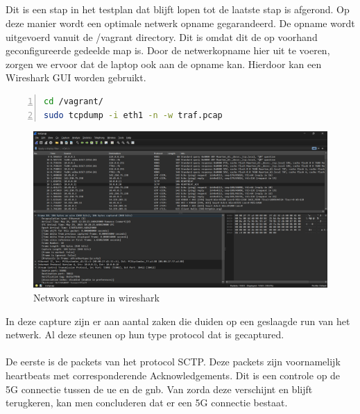 \subsection{}%
\label{sec:Test-capture}%

Dit is een stap in het testplan dat blijft lopen tot de laatste stap is afgerond. Op deze manier wordt een optimale netwerk opname gegarandeerd. De opname wordt uitgevoerd vanuit de /vagrant directory. Dit is omdat dit de op voorhand geconfigureerde gedeelde map is. Door de netwerkopname hier uit te voeren, zorgen we ervoor dat de laptop ook aan de opname kan. Hierdoor kan een Wireshark GUI worden gebruikt.

\begin{lstlisting}[basicstyle=\small, frame=single, breaklines=true, postbreak=\mbox{\textcolor{red}{$\hookrightarrow$}\space}, escapeinside ={\%,}, escapechar={!}, numbers=left, language=sh, caption=Test - Tcpdump]
cd /vagrant/
sudo tcpdump -i eth1 -n -w traf.pcap
\end{lstlisting}

\begin{figure}[H]
    \includegraphics[width=\linewidth]{../graphics/POC-wireshark.png}
    \caption{Network capture in wireshark}
    \label{fig:wireshark}
\end{figure}

In deze capture zijn er aan aantal zaken die duiden op een geslaagde run van het netwerk. Al deze steunen op hun type protocol dat is gecaptured.\\\\

De eerste is de packets van het protocol SCTP. Deze packets zijn voornamelijk heartbeats met corresponderende Acknowledgements. Dit is een controle op de 5G connectie tussen de \gls{ue} en de \gls{gnb}. Van zorda deze verschijnt en blijft terugkeren, kan men concluderen dat er een 5G connectie bestaat.\\


